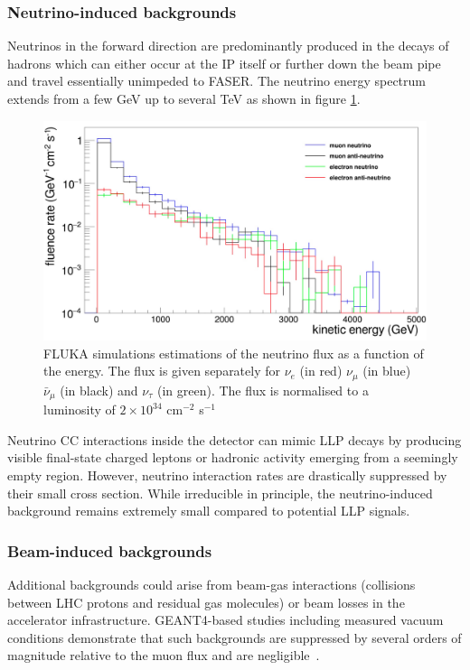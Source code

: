 			\subsubsection{Neutrino-induced backgrounds}  
			Neutrinos in the forward direction are predominantly produced in the decays of hadrons which can either occur at the IP itself or further down the beam pipe and travel essentially unimpeded to FASER. The neutrino energy spectrum extends from a few GeV up to several TeV as shown in figure \ref{im:neutrino_flux}.
			\begin{figure}[h]
				\centering
				\includegraphics[width=0.8\linewidth]{files/neutrino_flux}
				\caption{FLUKA simulations estimations of the neutrino flux as a function of the energy. The flux is given separately for $\nu_{e}$ (in red) $\nu_{\mu}$ (in blue) $\bar{\nu}_{\mu}$ (in black) and $\nu_{\tau}$ (in green). The flux is normalised to a luminosity of $2 \times 10^{34}$ cm$^{-2}$ s$^{-1}$}
				\label{im:neutrino_flux}
			\end{figure}

			Neutrino CC interactions inside the detector can mimic LLP decays by producing visible final-state charged leptons or hadronic activity emerging from a seemingly empty region. However, neutrino interaction rates are drastically suppressed by their small cross section.
			While irreducible in principle, the neutrino-induced background remains extremely small compared to potential LLP signals.

		\subsubsection{Beam-induced backgrounds}  
		Additional backgrounds could arise from beam-gas interactions (collisions between LHC protons and residual gas molecules) or beam losses in the accelerator infrastructure. GEANT4-based studies including measured vacuum conditions demonstrate that such backgrounds are suppressed by several orders of magnitude relative to the muon flux and are negligible~\cite{FASER_techprop}.


